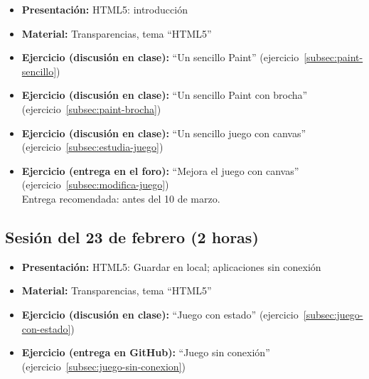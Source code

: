 \documentclass[a4paper,12pt]{report}
\begin{document}
\begin{itemize}
\item \textbf{Presentación:} HTML5: introducción
\item \textbf{Material:} Transparencias, tema ``HTML5''


\item \textbf{Ejercicio (discusión en clase):} ``Un sencillo Paint'' (ejercicio~\ref{subsec:paint-sencillo})
\item \textbf{Ejercicio (discusión en clase):} ``Un sencillo Paint con brocha'' (ejercicio~\ref{subsec:paint-brocha}) \\
 \item \textbf{Ejercicio (discusión en clase):} ``Un sencillo juego con canvas'' (ejercicio~\ref{subsec:estudia-juego})
 \item \textbf{Ejercicio (entrega en el foro):} ``Mejora el juego con canvas'' (ejercicio~\ref{subsec:modifica-juego}) \\
Entrega recomendada: antes del 10 de marzo.
\end{itemize}


\subsection{Sesión del 23 de febrero (2 horas)}

\begin{itemize}
 \item \textbf{Presentación:} HTML5: Guardar en local; aplicaciones sin conexión
 \item \textbf{Material:} Transparencias, tema ``HTML5''
 \item \textbf{Ejercicio (discusión en clase):} ``Juego con estado'' (ejercicio~\ref{subsec:juego-con-estado})
 \item \textbf{Ejercicio (entrega en GitHub):} ``Juego sin conexión'' (ejercicio~\ref{subsec:juego-sin-conexion}) \\
 \end{itemize}
\end{document}
